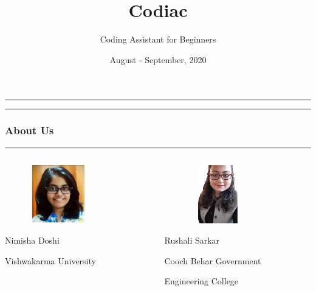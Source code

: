 \documentclass[14pt]{beamer}
\title[Codiac]{Codiac}
\author[]{Coding Assistant for Beginners}
\date []{August - September, 2020}
\begin{document}
\begin{frame}
    \noindent
    {\color{pink} \rule{\linewidth}{0.7mm} }
    \titlepage
    \noindent
    {\color{pink} \rule{\linewidth}{0.7mm} }
\end{frame}

\begin{frame}
    \frametitle{About Us}
    \noindent
    {\color{pink} \rule {\linewidth}{0.7mm}}
    \begin{columns}
    
    	\begin{column}{0.2\textwidth}
            \begin{figure}[htbp]
            \centerline{\includegraphics[width=1in, height=1in]{./Codiac/logos/nimisha.jpg}}
            \end{figure}
             \begin{spacing}{0.5}
              \centerline {\tiny Nimisha Doshi}
               \centerline {\tiny Vishwakarma University}
              \end{spacing}
        \end{column}
	
        \begin{column}{0.2\textwidth}
            \begin{figure}[htbp]
            \centerline{\includegraphics[width=1in, height=1in]{./Codiac/logos/rushali.jpeg}}
            \end{figure}
               \begin{spacing}{0.5}
          \centerline {\tiny Rushali Sarkar} 
           \centerline {\tiny Cooch Behar Government} 
           \centerline {\tiny Engineering College} 
               \end{spacing}
        \end{column}
	

\end{columns}
\end{frame}
\end{document}
